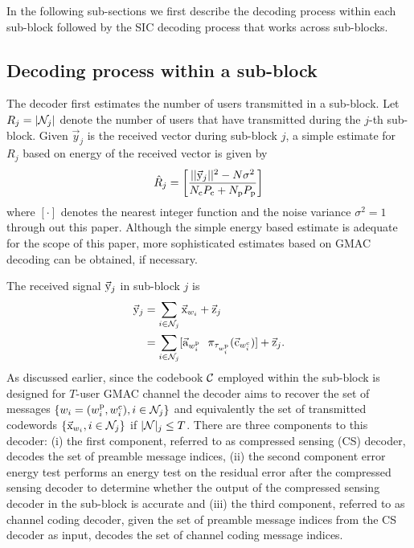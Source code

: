 In the following sub-sections we first describe the decoding process within each sub-block followed by the SIC decoding process that works across sub-blocks. 

\subsection{Decoding process within a sub-block}
\label{subsubsec:decoder_subblock}
The decoder first estimates the number of users transmitted in a sub-block. Let $R_j=|\mathcal{N}_j|$ denote the number of users that have transmitted during the $j$-th sub-block. Given $\vec{y}_j$ is the received vector during sub-block $j$, a simple estimate for $R_j$ based on energy of the received vector is given by
\begin{align*}
\hat{R}_{j}= \left[\frac{||\vec{\mathrm{y}}_j||^2-N\sigma^2}{N_{\mathrm{c}}P_{\mathrm{c}}+N_{\mathrm{p}}P_{\mathrm{p}}}\right]
\end{align*} 
where $[\cdot ]$ denotes the nearest integer function and the noise variance $\sigma^2=1$ through out this paper. Although the simple energy based estimate is adequate for the scope of this paper, more sophisticated estimates based on GMAC decoding can be obtained, if necessary. 

The received signal $\vec{\mathrm{y}}_j$ in sub-block $j$ is
\begin{align*}
\vec{\mathrm{y}}_j&=\sum_{i\in\mathcal{N}_j}\vec{\mathrm{x}}_{w_i}+\vec{\mathrm{z}}_j ~~\qquad \\
&=\sum_{i\in\mathcal{N}_j} [\vec{\mathrm{a}}_{w^\mathrm{p}_i} ~~\pi_{\tau_{w^\mathrm{p}_i}}(\vec{\mathrm{c}}_{w^\mathrm{c}_i})] +\vec{\mathrm{z}}_j.
\end{align*} 
As discussed earlier, since the codebook $\mathcal{C}$ employed within the sub-block is designed for $T$-user GMAC channel the decoder aims to recover the set of messages $\{w_i=(w^\mathrm{p}_i,w^\mathrm{c}_i),i\in\mathcal{N}_j\}$ and equivalently the set of transmitted codewords $\{\vec{\mathrm{x}}_{w_i},i\in\mathcal{N}_j\}$ if $|\mathcal{N}|_j\leq T$. There are three components to this decoder: (i) the first component, referred to as compressed sensing (CS) decoder, decodes the set of preamble message indices, (ii) the second component error energy test performs an energy test on the residual error after the compressed sensing decoder to determine whether the output of the compressed sensing decoder in the sub-block is accurate and (iii) the third component, referred to as channel coding decoder, %
given the set of preamble message indices from the CS decoder as input, decodes the set of channel coding message indices.

